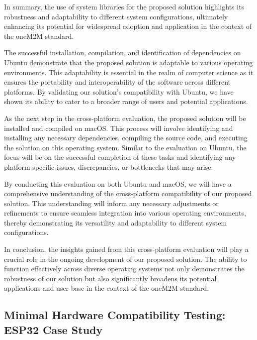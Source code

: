 \documentclass[a4paper,fleqn]{cas-dc}
\begin{document}
In summary, the use of system libraries for the proposed solution highlights its robustness and adaptability to different system configurations, ultimately enhancing its potential for widespread adoption and application in the context of the oneM2M standard.

The successful installation, compilation, and identification of dependencies on Ubuntu demonstrate that the proposed solution is adaptable to various operating environments. This adaptability is essential in the realm of computer science as it ensures the portability and interoperability of the software across different platforms. By validating our solution's compatibility with Ubuntu, we have shown its ability to cater to a broader range of users and potential applications.

As the next step in the cross-platform evaluation, the proposed solution will be installed and compiled on macOS. This process will involve identifying and installing any necessary dependencies, compiling the source code, and executing the solution on this operating system. Similar to the evaluation on Ubuntu, the focus will be on the successful completion of these tasks and identifying any platform-specific issues, discrepancies, or bottlenecks that may arise.





By conducting this evaluation on both Ubuntu and macOS, we will have a comprehensive understanding of the cross-platform compatibility of our proposed solution. This understanding will inform any necessary adjustments or refinements to ensure seamless integration into various operating environments, thereby demonstrating its versatility and adaptability to different system configurations.

In conclusion, the insights gained from this cross-platform evaluation will play a crucial role in the ongoing development of our proposed solution. The ability to function effectively across diverse operating systems not only demonstrates the robustness of our solution but also significantly broadens its potential applications and user base in the context of the oneM2M standard.
%


\subsection{Minimal Hardware Compatibility Testing: ESP32 Case Study}
\end{document}
